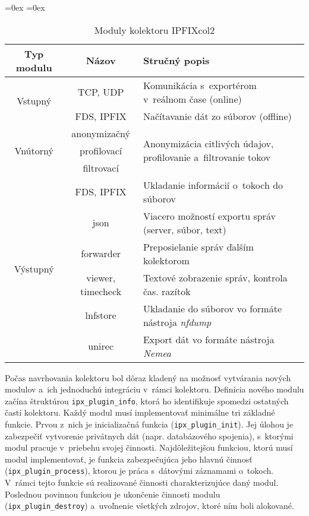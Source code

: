 \vspace{1em}

\begin{table}[ht]
    \centering
    \aboverulesep=0ex
    \belowrulesep=0ex
    \renewcommand{\arraystretch}{1.2}
    \begin{tabular}{c|cp{8.6cm}}
         Typ modulu & Názov & Stručný popis\\ \toprule
         \multirow{2}{*}{Vstupný} & TCP, UDP & Komunikácia s~exportérom v~reálnom čase (online) \\
         & FDS, IPFIX & Načítavanie dát zo súborov (offline) \\ \midrule
         \multirow{3}{*}{Vnútorný} & anonymizačný & \multirow{3}{8cm}{Anonymizácia citlivých údajov, profilovanie a~filtrovanie tokov} \\
         & profilovací & \\
         & filtrovací & \\ \midrule
         \multirow{6}{*}{Výstupný} & FDS, IPFIX & Ukladanie informácií o~tokoch do súborov \\
         & json & Viacero možností exportu správ (server, súbor, text) \\
         & forwarder & Preposielanie správ ďalším kolektorom \\
         & viewer, timecheck & Textové zobrazenie správ, kontrola čas. razítok \\
         & lnfstore & Ukladanie do súborov vo formáte nástroja \textit{nfdump} \\
         & unirec & Export dát vo formáte nástroja \textit{Nemea} \\ \bottomrule
    \end{tabular}
    \caption{Moduly kolektoru IPFIXcol2}
    \label{tab:ipfixcol2_moduly}
\end{table} \newpage

Počas navrhovania kolektoru bol dôraz kladený na možnosť vytvárania nových modulov a~ich jednoduchú integráciu v~rámci kolektoru. Definícia nového modulu začína štruktúrou \texttt{ipx\_plugin\_info}, ktorá ho identifikuje spomedzi ostatných častí kolektoru. Každý modul musí
implementovať minimálne tri základné funkcie. Prvou z~nich je inicializačná funkcia (\texttt{ipx\_plugin\_init}). Jej úlohou je zabezpečiť vytvorenie privátnych dát (napr. databázového spojenia), s~ktorými modul pracuje v~priebehu svojej činnosti. Najdôležitejšou funkciou, ktorú
musí modul implementovať, je funkcia zabezpečujúca jeho hlavnú činnosť (\texttt{ipx\_plugin\_process}), ktorou je práca s~dátovými záznamami o~tokoch. V~rámci tejto funkcie sú realizované činnosti charakterizujúce daný modul. Poslednou povinnou funkciou je ukončenie činnosti
modulu (\texttt{ipx\_plugin\_destroy}) a~uvoľnenie všetkých zdrojov, ktoré ním boli alokované.

